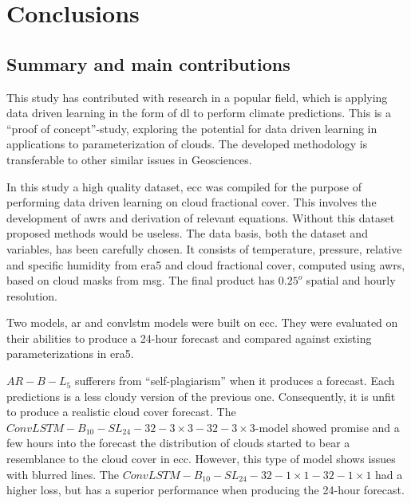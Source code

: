 \chapter{Conclusions}
\section{Summary and main contributions}
This study has contributed with research in a popular field, which is applying data driven learning in the form of \acrshort{dl} to perform climate predictions.
This is a ``proof of concept''-study, exploring the potential for data driven learning in applications to parameterization of clouds. The developed methodology is transferable to other similar issues in Geosciences.

In this study a high quality dataset, \acrfull{ecc} was compiled for the purpose of performing data driven learning on cloud fractional cover. This involves the development of \acrfull{awrs} and derivation of relevant equations. Without this dataset proposed methods would be useless. The data basis, both the dataset and variables, has been carefully chosen. It consists of temperature, pressure, relative and specific humidity from \acrshort{era5} and cloud fractional cover, computed using \acrshort{awrs}, based on cloud masks from \acrshort{msg}. The final product has $0.25^o$ spatial and hourly resolution.

Two models, \acrfull{ar} and \acrfull{convlstm} models were built on \acrshort{ecc}. They were evaluated on their abilities to produce a 24-hour forecast and compared against existing parameterizations in \acrshort{era5}. 

$AR-B-L_5$ sufferers from ``self-plagiarism'' when it produces a forecast. Each predictions is a less cloudy version of the previous one. Consequently, it is unfit to produce a realistic cloud cover forecast.  The $ConvLSTM-B_{10}-SL_{24}-32-3\times3-32-3 \times3$-model showed promise and a few hours into the forecast the distribution of clouds started to bear a resemblance to the cloud cover in \acrshort{ecc}. However, this type of model shows issues with blurred lines. 
The $ConvLSTM-B_{10}-SL_{24}-32-1\times1-32-1 \times1$ had a higher loss, but has
a superior performance when producing the 24-hour forecast.


